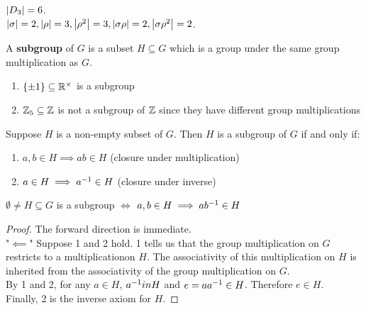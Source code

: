 \begin{example}
    $\left|D_3\right| = 6$. \\
    $\left|\sigma\right|=2, \left|\rho\right|=3, \left|\rho^2\right|=3, \left|\sigma\rho\right|=2, \left|\sigma\rho^2\right|=2$.
\end{example}

\begin{definition}[a subgroup]
    A \textbf{subgroup} of $G$ is a subset $H \subseteq G$ which is a group under the same group multiplication as $G$.
\end{definition}

\newpage %
\begin{example}[subgroups]
    \spacebeforelist
    \begin{enumerate}
        \item $\left\{\pm 1\right\} \subseteq \mathbb{R}^\times$ is a subgroup
        \item $\mathbb{Z}_5 \subseteq \mathbb{Z}$ is not a subgroup of $\mathbb{Z}$ since they have different group multiplications
    \end{enumerate}
\end{example}

\begin{theorem}
    Suppose $H$ is a non-empty subset of $G$. Then $H$ is a subgroup of $G$ if and only if:
    \begin{enumerate}
        \item $a, b \in H \implies ab \in H$ (closure under multiplication)
        \item $a \in H \implies a^{-1} \in H$ (closure under inverse)
    \end{enumerate}
\end{theorem}

\begin{theorem}
    $\emptyset \neq H \subseteq G$ is a subgroup $\iff$ $a,b \in H \implies ab^{-1} \in H$
\end{theorem}

\begin{proof}
    The forward direction is immediate. \\
    "$\impliedby$" Suppose 1 and 2 hold. 1 tells us that the group multiplication on $G$ restricts to a multiplicationon $H$. The associativity of this multiplication on $H$ is inherited from the associativity of the group multiplication on $G$. \\
    By 1 and 2, for any $a \in H$, $a^{-1} in H$ and $e = a a^{-1} \in H$. Therefore $e \in H$. \\
    Finally, 2 is the inverse axiom for $H$.
\end{proof}

